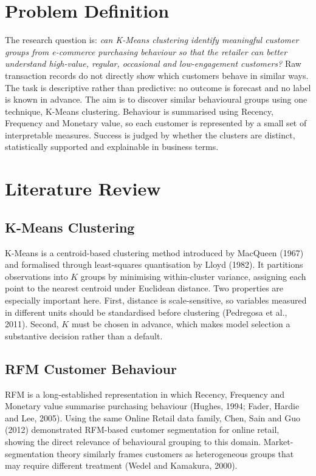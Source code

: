 \documentclass[11pt,a4paper]{article}
\begin{document}
\clearpage
\section{Problem Definition}
The research question is: \emph{can K-Means clustering identify meaningful customer groups from e-commerce purchasing behaviour so that the retailer can better understand high-value, regular, occasional and low-engagement customers?} Raw transaction records do not directly show which customers behave in similar ways. The task is descriptive rather than predictive: no outcome is forecast and no label is known in advance. The aim is to discover similar behavioural groups using one technique, K-Means clustering. Behaviour is summarised using Recency, Frequency and Monetary value, so each customer is represented by a small set of interpretable measures. Success is judged by whether the clusters are distinct, statistically supported and explainable in business terms.

\clearpage
\section{Literature Review}
\subsection{K-Means Clustering}
K-Means is a centroid-based clustering method introduced by MacQueen (1967) and formalised through least-squares quantisation by Lloyd (1982). It partitions observations into $K$ groups by minimising within-cluster variance, assigning each point to the nearest centroid under Euclidean distance. Two properties are especially important here. First, distance is scale-sensitive, so variables measured in different units should be standardised before clustering (Pedregosa et al., 2011). Second, $K$ must be chosen in advance, which makes model selection a substantive decision rather than a default.

\subsection{RFM Customer Behaviour}
RFM is a long-established representation in which Recency, Frequency and Monetary value summarise purchasing behaviour (Hughes, 1994; Fader, Hardie and Lee, 2005). Using the same Online Retail data family, Chen, Sain and Guo (2012) demonstrated RFM-based customer segmentation for online retail, showing the direct relevance of behavioural grouping to this domain. Market-segmentation theory similarly frames customers as heterogeneous groups that may require different treatment (Wedel and Kamakura, 2000).
\end{document}
